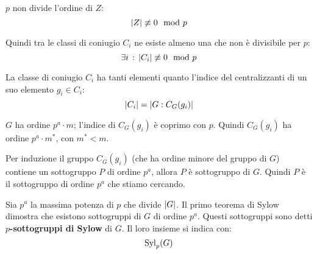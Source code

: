 \begin{dimostrazione}
    $p$ non divide l'ordine di $Z$:
    \begin{equation*}
        \lvert Z \rvert \not\equiv 0 \mod p
    \end{equation*}

    Quindi tra le classi di coniugio $C_i$ ne esiste almeno una che non è divisibile per $p$:
    \begin{equation*}
        \exists i \,:\, \lvert C_i \rvert \not\equiv 0 \mod p
    \end{equation*}

    La classe di coniugio $C_i$ ha tanti elementi quanto l'indice del centralizzanti di un suo elemento $g_i \in C_i$:
    \begin{equation*}
        \lvert C_i \rvert = \lvert G:C_G(g_i) \rvert
    \end{equation*}

    $G$ ha ordine $p^a \cdot m$; l'indice di $C_G(g_i)$ è coprimo con $p$. Quindi $C_G(g_i)$ ha ordine $p^a \cdot m^*$,
    con $m^* < m$.

    Per induzione il gruppo $C_G(g_i)$ (che ha ordine minore del gruppo di $G$) contiene un sottogruppo $P$ di ordine
    $p^a$, allora $P$ è sottogruppo di $G$.
    Quindi $P$ è il sottogruppo di ordine $p^a$ che stiamo cercando.
\end{dimostrazione}

Sia $p^a$ la massima potenza di $p$ che divide $\lvert G \rvert$.
Il primo teorema di Sylow dimostra che esistono sottogruppi di $G$ di ordine $p^a$.
Questi sottogruppi sono detti \textbf{$p$-sottogruppi di Sylow} di $G$.
Il loro insieme si indica con:
\begin{equation*}
    \operatorname{Syl}_p(G)
\end{equation*}
